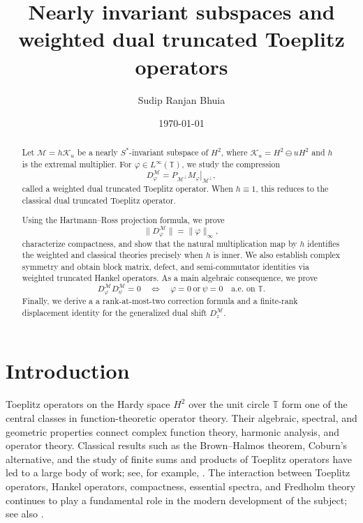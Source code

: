 \documentclass[12pt]{amsart}
\date{\today}
\theoremstyle{definition}
\theoremstyle{remark}
\def \T{\mathbb{T}}
\newcommand{\clm}{\mathcal{M}}
\newcommand{\clk}{\mathcal{K}}
\newcommand{\vp}{\varphi}
\newcommand\restr[2]{\ensuremath{\left.#1\right|_{#2}}}
\numberwithin{equation}{section}
\begin{document}
\title[Weighted DTTOs on nearly invariant subspaces]
{Nearly invariant subspaces and weighted dual truncated Toeplitz operators}
\author{Sudip Ranjan Bhuia}
\address{Department of Mathematics, Shiv Nadar University, NH91, Tehsil Dadri, Greater Noida, Gautam Buddha Nagar, Uttar Pradesh-201314, India}


\begin{abstract}
Let $\clm=h\clk_u$ be a nearly $S^*$-invariant subspace of $H^2$, where $\clk_u=H^2\ominus uH^2$ and $h$ is the extremal multiplier. For $\vp\in L^\infty(\T)$, we study the compression
\[
D_\vp^\clm = \restr{P_{\clm^\perp}M_\vp}{\clm^\perp},
\]
called a weighted dual truncated Toeplitz operator. When $h\equiv1$, this reduces to the classical dual truncated Toeplitz operator.

Using the Hartmann--Ross projection formula, we prove
\[
\|D_\vp^\clm\|=\|\vp\|_\infty,
\]
characterize compactness, and show that the natural multiplication map by $h$ identifies the weighted and classical theories precisely when $h$ is inner. We also establish complex symmetry and obtain block matrix, defect, and semi-commutator identities via weighted truncated Hankel operators. As a main algebraic consequence, we prove
\[
D_\vp^\clm D_\psi^\clm=0
\quad\Longleftrightarrow\quad
\vp=0\ \text{or}\ \psi=0
\quad\text{a.e. on }\T.
\]
Finally, we derive a a rank-at-most-two correction formula and a finite-rank displacement identity for the generalized dual shift
$D_z^\clm$.
\end{abstract}
\maketitle


\section{Introduction}

Toeplitz operators on the Hardy space $H^2$ over the unit circle $\T$ form one of the central classes in function-theoretic operator theory. Their algebraic, spectral, and geometric properties connect complex function theory, harmonic analysis, and operator theory. Classical results such as
the Brown--Halmos theorem, Coburn's alternative, and the study of finite sums and products of Toeplitz operators have led to a large body of work; see, for example, \cite{Brown:Douglas, Ding, Gorkin:Zheng, Guo:Zheng, Halmos:PI, Zheng}. The interaction between Toeplitz operators, Hankel operators, compactness, essential spectra, and Fredholm theory continues to play a fundamental role in the modern development of the subject; see also \cite{Douglas:Book, Garcia:PIM, Ma:Yan:Zheng, Peller:Book}.
\end{document}
